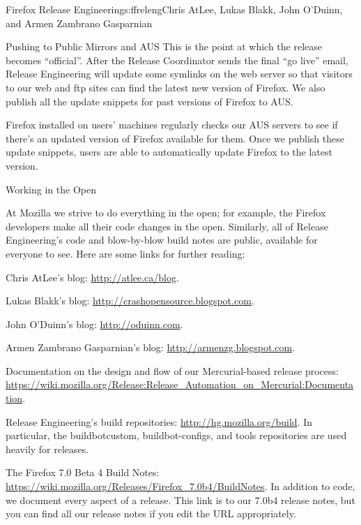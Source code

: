 \begin{aosachapter}{Firefox Release Engineering}{s:ffreleng}{Chris AtLee, Lukas Blakk, John O'Duinn, and Armen Zambrano Gasparnian}
\begin{aosasect1}{Pushing to Public Mirrors and AUS}
This is the point at which the release becomes ``official''. After the
Release Coordinator sends the final ``go live'' email, Release
Engineering will update some symlinks on the web server so that
visitors to our web and ftp sites can find the latest new version of
Firefox. We also publish all the update snippets for past versions of
Firefox to AUS. 

Firefox installed on users' machines regularly checks our AUS
servers to see if there's an updated version of Firefox available for
them. Once we publish these update snippets, users are able to
automatically update Firefox to the latest version.
  
\end{aosasect1}

\begin{aosasect1}{Working in the Open}

At Mozilla we strive to do everything in the open; for example, the Firefox
developers make all their code changes in the open. Similarly, all of
Release Engineering's code and blow-by-blow build notes are public,
available for everyone to see.  Here are some links for further
reading:

\begin{aosaitemize}  

\item Chris AtLee's blog: \url{http://atlee.ca/blog}.

\item Lukas Blakk's blog: \url{http://crashopensource.blogspot.com}.

\item John O'Duinn's blog: \url{http://oduinn.com}.

\item Armen Zambrano Gasparnian's blog: \url{http://armenzg.blogspot.com}.

\item Documentation on the design and flow of our Mercurial-based release process: \url{https://wiki.mozilla.org/Release:Release_Automation_on_Mercurial:Documentation}.

\item Release Engineering's build repositories:
  \url{http://hg.mozilla.org/build}.  In particular, the
  buildbotcustom, buildbot-configs, and tools repositories are used
  heavily for releases.

\item The Firefox 7.0 Beta 4 Build Notes:
  \url{https://wiki.mozilla.org/Releases/Firefox_7.0b4/BuildNotes}.
  In addition to code, we document every aspect of a release. This
  link is to our 7.0b4 release notes, but you can find all our release
  notes if you edit the URL appropriately.


\end{aosaitemize}
\end{aosasect1}
\end{aosachapter}
